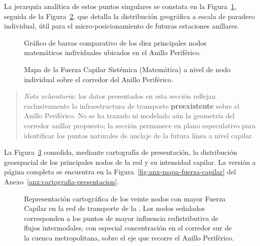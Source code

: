 La jerarquía analítica de estos puntos singulares se constata en la
Figura~\ref{fig:barplot-nodos-periferico}, seguida de la
Figura~\ref{fig:mapa-nodos-periferico}, que detalla la distribución geográfica a
escala de paradero individual, útil para el micro-posicionamiento de futuras
estaciones anillares.

\begin{figure}[H]
    \centering
    \caption[Fuerza Capilar de nodos individuales en Anillo Periférico]{
    Gráfico de barras comparativo de los diez principales nodos matemáticos
    individuales ubicados en el Anillo Periférico.}
    \label{fig:barplot-nodos-periferico}
\end{figure}

\begin{figure}[H]
    \centering
    \caption[Distribución espacial de nodos matemáticos en el Periférico]{Mapa
    de la Fuerza Capilar Sistémica (Matemática) a nivel de nodo individual sobre
    el corredor del Anillo Periférico.}
    \label{fig:mapa-nodos-periferico}
\end{figure}

\vspace{2ex}
\begin{quote}
    \small\textit{Nota aclaratoria:} los datos presentados en esta sección
    reflejan exclusivamente la infraestructura de transporte \textbf{preexistente}
    sobre el Anillo Periférico. No se ha trazado ni modelado aún la geometría
    del corredor anillar propuesto; la sección permanece en plano especulativo
    para identificar los puntos naturales de anclaje de la futura línea a nivel
    capilar.
\end{quote}

La Figura~\ref{fig:mapa-fc-presentacion} consolida, mediante cartografía de
presentación, la distribución geoespacial de los principales nodos 
de la red y su intensidad capilar. La versión a página completa se encuentra en
la Figura~\ref{fig:anx-mapa-fuerza-capilar} del
Anexo~\ref{anx:cartografia-presentacion}.

\begin{figure}[H]
    \centering
    \caption[Cartografía de presentación — Fuerza Capilar y nodos \textit{hub} principales]{
    Representación cartográfica de los veinte nodos con mayor Fuerza Capilar en
    la red de transporte de la \zmvm{}. Los nodos señalados corresponden a los
    puntos de mayor influencia redistributiva de flujos intermodales, con especial
    concentración en el corredor sur de la cuenca metropolitana, sobre el eje
    que recorre el Anillo Periférico.}
    \label{fig:mapa-fc-presentacion}
\end{figure}

